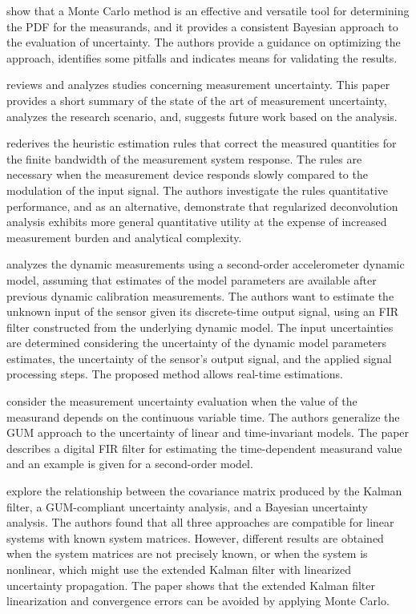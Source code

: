 \documentclass[11pt]{article}
\begin{document}
\citet{Cox06} show that a Monte Carlo method is an effective and versatile tool for determining the PDF for the measurands, and it provides a consistent Bayesian approach to the evaluation of uncertainty. The authors provide a guidance on optimizing the approach, identifies some pitfalls and indicates means for validating the results.

\citet{daSilva12} reviews and analyzes studies concerning measurement uncertainty. This paper provides a short summary of the state of the art of measurement uncertainty, analyzes the research scenario, and, suggests future work based on the analysis.

\citet{Dienstfrey14} rederives the heuristic estimation rules that correct the measured quantities for the finite bandwidth of the measurement system response.
The rules are necessary when the measurement device responds slowly compared to the modulation of the input signal. The authors investigate the rules quantitative performance, and as an alternative, demonstrate that regularized deconvolution analysis exhibits more general quantitative utility at the expense of increased measurement burden and analytical complexity.


\citet{Elster07} analyzes the dynamic measurements using a second-order accelerometer dynamic model, assuming that estimates of the model parameters are available after previous dynamic calibration measurements. The authors want to estimate the unknown input of the sensor given its discrete-time output signal, using an FIR filter constructed from the underlying dynamic model. The input  uncertainties are determined considering the uncertainty of the dynamic model parameters estimates, the uncertainty of the sensor's output signal, and the applied signal processing steps. The proposed method allows real-time estimations.

\citet{Elster08} consider the measurement uncertainty evaluation when the value of the measurand depends on the continuous variable time. The authors generalize the GUM approach to the uncertainty of linear and time-invariant models. The paper describes a digital FIR filter for estimating the time-dependent  measurand value and an example is given for a second-order model.

\citet{Eichstadt16b} explore the relationship between the covariance matrix produced by the Kalman filter, a GUM-compliant uncertainty analysis, and a Bayesian uncertainty analysis. The authors found that all three approaches are compatible for linear systems with known system matrices. However, different results are obtained when the system matrices are not precisely known, or when the system is nonlinear, which might use the extended Kalman filter with linearized uncertainty propagation. The paper shows that the extended Kalman filter linearization and convergence errors can be avoided by applying Monte Carlo.
\end{document}
